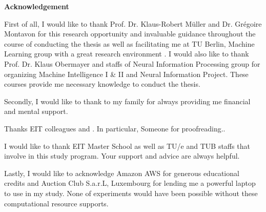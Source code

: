 \thispagestyle{empty}
\vspace*{3cm}
\begin{center}
    \textbf{Acknowledgement}
\end{center}

First of all, I would like to thank Prof. Dr. Klaus-Robert M\"{u}ller and Dr. Gr\'{e}goire Montavon for this research opportunity and invaluable guidance throughout  the course of conducting the thesis as well as facilitating me at TU Berlin, Machine Learning group with a great research environment . I would also like to thank Prof. Dr. Klaus Obermayer and staffs of Neural Information Processing group for organizing Machine Intelligence I \& II and Neural Information Project. These courses provide me necessary knowledge to conduct the thesis.


Secondly, I would like to thank to my family for always providing me financial and mental support. 

Thanks EIT colleagues and . In particular, Someone for proofreading..

I would like to thank EIT Master School as well as TU/e and TUB staffs that involve in this study program.  Your support and advice are always helpful. 

Lastly, I would like to acknowledge Amazon AWS for generous educational credits and Auction Club S.a.r.L, Luxembourg for lending me a powerful laptop to use in my study. None of experiments would have been possible without these computational resource supports.
